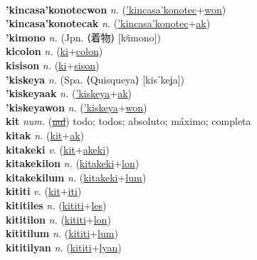 \label{'kincasa'konotec} \\
\textbf{'kincasa'konotecwon} \textit{n.} (\hyperref['kincasa'konotec]{'kincasa'konotec}+\hyperref[won]{won})
 \label{'kincasa'konotecwon} \\
\textbf{'kincasa'konotecak} \textit{n.} (\hyperref['kincasa'konotec]{'kincasa'konotec}+\hyperref[ak]{ak})
 \label{'kincasa'konotecak} \\
\textbf{'kimono} \textit{n.} (Jpn. ⟨着物⟩ [kʲimono])
 \label{'kimono} \\
\textbf{kicolon} \textit{n.} (\hyperref[ki]{ki}+\hyperref[colon]{colon})
 \label{kicolon} \\
\textbf{kisison} \textit{n.} (\hyperref[ki]{ki}+\hyperref[sison]{sison})
 \label{kisison} \\
\textbf{'kiskeya} \textit{n.} (Spa. ⟨Quisqueya⟩ [kisˈkeʝa])
 \label{'kiskeya} \\
\textbf{'kiskeyaak} \textit{n.} (\hyperref['kiskeya]{'kiskeya}+\hyperref[ak]{ak})
 \label{'kiskeyaak} \\
\textbf{'kiskeyawon} \textit{n.} (\hyperref['kiskeya]{'kiskeya}+\hyperref[won]{won})
 \label{'kiskeyawon} \\
\textbf{kit} \textit{num.} (\hyperref[nul]{\sout{nul}})
todo; todos; absoluto; máximo; completa \label{kit} \\
\textbf{kitak} \textit{n.} (\hyperref[kit]{kit}+\hyperref[ak]{ak})
 \label{kitak} \\
\textbf{kitakeki} \textit{v.} (\hyperref[kit]{kit}+\hyperref[akeki]{akeki})
 \label{kitakeki} \\
\textbf{kitakekilon} \textit{n.} (\hyperref[kitakeki]{kitakeki}+\hyperref[lon]{lon})
 \label{kitakekilon} \\
\textbf{kitakekilum} \textit{n.} (\hyperref[kitakeki]{kitakeki}+\hyperref[lum]{lum})
 \label{kitakekilum} \\
\textbf{kititi} \textit{v.} (\hyperref[kit]{kit}+\hyperref[iti]{iti})
 \label{kititi} \\
\textbf{kititiles} \textit{n.} (\hyperref[kititi]{kititi}+\hyperref[les]{les})
 \label{kititiles} \\
\textbf{kititilon} \textit{n.} (\hyperref[kititi]{kititi}+\hyperref[lon]{lon})
 \label{kititilon} \\
\textbf{kititilum} \textit{n.} (\hyperref[kititi]{kititi}+\hyperref[lum]{lum})
 \label{kititilum} \\
\textbf{kititilyan} \textit{n.} (\hyperref[kititi]{kititi}+\hyperref[lyan]{lyan})
 \label{kititilyan} \\
